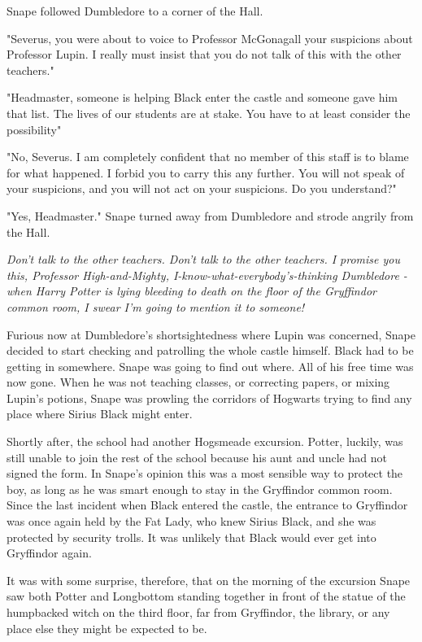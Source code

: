 Snape followed Dumbledore to a corner of the Hall.

"Severus, you were about to voice to Professor McGonagall your suspicions about Professor Lupin. I really must insist that you do not talk of this with the other teachers."

"Headmaster, someone is helping Black enter the castle and someone gave him that list. The lives of our students are at stake. You have to at least consider the possibility{\el}"

"No, Severus. I am completely confident that no member of this staff is to blame for what happened. I forbid you to carry this any further. You will not speak of your suspicions, and you will not act on your suspicions. Do you understand?"

"Yes, Headmaster." Snape turned away from Dumbledore and strode angrily from the Hall.

\emph{Don't talk to the other teachers. Don't talk to the other teachers. I promise you this, Professor High-and-Mighty, I-know-what-everybody's-thinking Dumbledore - when Harry Potter is lying bleeding to death on the floor of the Gryffindor common room, I swear I'm going to mention it to someone!}

Furious now at Dumbledore's shortsightedness where Lupin was concerned, Snape decided to start checking and patrolling the whole castle himself. Black had to be getting in somewhere. Snape was going to find out where. All of his free time was now gone. When he was not teaching classes, or correcting papers, or mixing Lupin's potions, Snape was prowling the corridors of Hogwarts trying to find any place where Sirius Black might enter.

Shortly after, the school had another Hogsmeade excursion. Potter, luckily, was still unable to join the rest of the school because his aunt and uncle had not signed the form. In Snape's opinion this was a most sensible way to protect the boy, as long as he was smart enough to stay in the Gryffindor common room. Since the last incident when Black entered the castle, the entrance to Gryffindor was once again held by the Fat Lady, who knew Sirius Black, and she was protected by security trolls. It was unlikely that Black would ever get into Gryffindor again.

It was with some surprise, therefore, that on the morning of the excursion Snape saw both Potter and Longbottom standing together in front of the statue of the humpbacked witch on the third floor, far from Gryffindor, the library, or any place else they might be expected to be.

